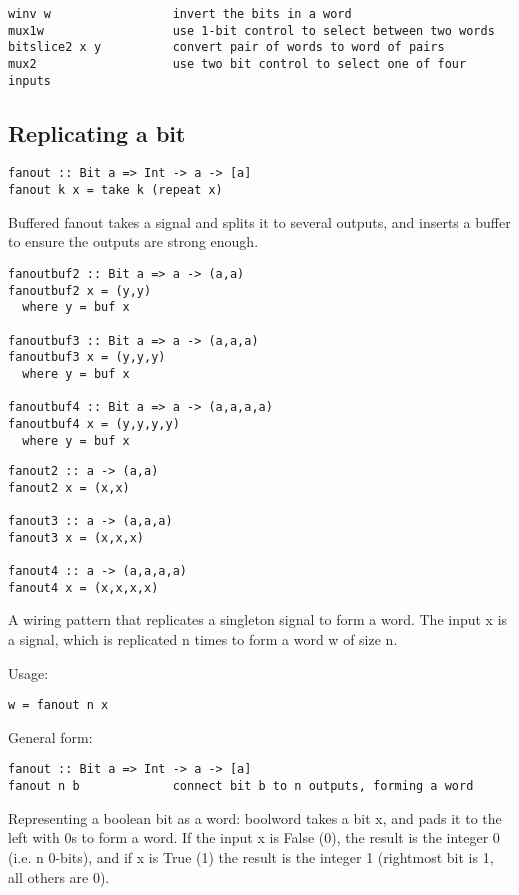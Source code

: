 \documentclass[11pt]{article}
\begin{document}
\begin{verbatim}
winv w                 invert the bits in a word
mux1w                  use 1-bit control to select between two words
bitslice2 x y          convert pair of words to word of pairs
mux2                   use two bit control to select one of four inputs
\end{verbatim}

\subsection{Replicating a bit}
\label{sec:org87ac5dd}

\begin{verbatim}
fanout :: Bit a => Int -> a -> [a]
fanout k x = take k (repeat x)
\end{verbatim}


Buffered fanout takes a signal and splits it to several outputs, and
inserts a buffer to ensure the outputs are strong enough.


\begin{verbatim}
fanoutbuf2 :: Bit a => a -> (a,a)
fanoutbuf2 x = (y,y)
  where y = buf x

fanoutbuf3 :: Bit a => a -> (a,a,a)
fanoutbuf3 x = (y,y,y)
  where y = buf x

fanoutbuf4 :: Bit a => a -> (a,a,a,a)
fanoutbuf4 x = (y,y,y,y)
  where y = buf x
\end{verbatim}



\begin{verbatim}
fanout2 :: a -> (a,a)
fanout2 x = (x,x)

fanout3 :: a -> (a,a,a)
fanout3 x = (x,x,x)

fanout4 :: a -> (a,a,a,a)
fanout4 x = (x,x,x,x)
\end{verbatim}


A wiring pattern that replicates a singleton signal to form a
word. The input x is a signal, which is replicated n times to form a
word w of size n.

Usage:
\begin{verbatim}
w = fanout n x
\end{verbatim}

General form:
\begin{verbatim}
fanout :: Bit a => Int -> a -> [a]
fanout n b             connect bit b to n outputs, forming a word
\end{verbatim}

Representing a boolean bit as a word: boolword takes a bit x, and
pads it to the left with 0s to form a word.  If the input x is
False (0), the result is the integer 0 (i.e. n 0-bits), and if x is
True (1) the result is the integer 1 (rightmost bit is 1, all
others are 0).
\end{document}
